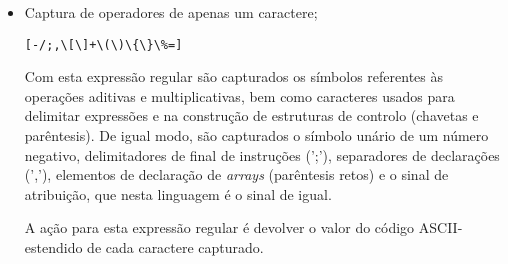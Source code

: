 \begin{itemize}
	\item Captura de operadores de apenas um caractere; 
\begin{verbatim}
[-/;,\[\]+\(\)\{\}\%=]  
\end{verbatim}

Com esta expressão regular são capturados os símbolos referentes às operações
aditivas e multiplicativas, bem como caracteres usados para delimitar expressões
e na construção de estruturas de controlo (chavetas e parêntesis). De igual
modo, são capturados o símbolo unário de um número negativo, delimitadores de
final de instruções (';'), separadores de declarações (','), elementos de declaração
de \emph{arrays} (parêntesis retos) e o sinal de atribuição, que nesta
linguagem é o sinal de igual. 

A ação para esta expressão regular é devolver o valor do código ASCII-estendido
de cada caractere capturado.



\end{itemize}
